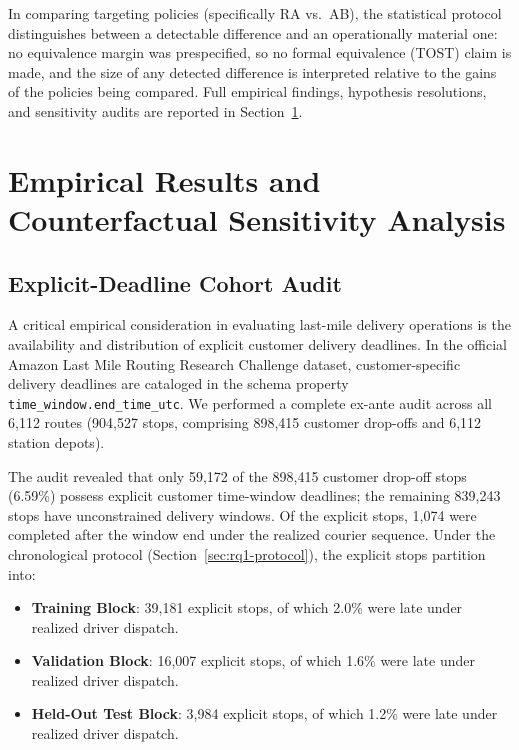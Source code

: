 \documentclass[11pt,a4paper]{article}
\begin{document}
In comparing targeting policies (specifically RA vs.\ AB), the statistical protocol distinguishes between a detectable difference and an operationally material one: no equivalence margin was prespecified, so no formal equivalence (TOST) claim is made, and the size of any detected difference is interpreted relative to the gains of the policies being compared. Full empirical findings, hypothesis resolutions, and sensitivity audits are reported in Section~\ref{sec:results}.


\section{Empirical Results and Counterfactual Sensitivity Analysis}\label{sec:results}

\subsection{Explicit-Deadline Cohort Audit}\label{sec:res-explicit-audit}

A critical empirical consideration in evaluating last-mile delivery operations is the availability and distribution of explicit customer delivery deadlines. In the official Amazon Last Mile Routing Research Challenge dataset, customer-specific delivery deadlines are cataloged in the schema property \texttt{time\_window.end\_time\_utc}. We performed a complete ex-ante audit across all 6,112 routes (904,527 stops, comprising 898,415 customer drop-offs and 6,112 station depots).

The audit revealed that only 59,172 of the 898,415 customer drop-off stops (6.59\%) possess explicit customer time-window deadlines; the remaining 839,243 stops have unconstrained delivery windows. Of the explicit stops, 1,074 were completed after the window end under the realized courier sequence. Under the chronological protocol (Section~\ref{sec:rq1-protocol}), the explicit stops partition into:
\begin{itemize}
    \item \textbf{Training Block}: 39,181 explicit stops, of which 2.0\% were late under realized driver dispatch.
    \item \textbf{Validation Block}: 16,007 explicit stops, of which 1.6\% were late under realized driver dispatch.
    \item \textbf{Held-Out Test Block}: 3,984 explicit stops, of which 1.2\% were late under realized driver dispatch.
\end{itemize}
\end{document}
